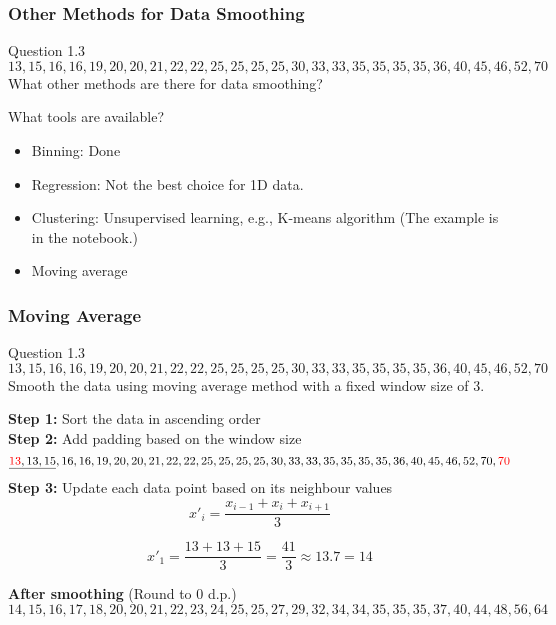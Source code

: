 \documentclass[aspectratio=169, 10pt]{beamer}
\begin{document}
\begin{frame}[t]
    \frametitle{Other Methods for Data Smoothing}

    \begin{block}{Question 1.3}
        \[13,15,16,16,19,20,20,21,22,22,25,25,25,25,30,33,33,35,35,35,35,36,40,45,46,52,70\]
        What other methods are there for data smoothing?
    \end{block}

    What tools are available?
    \begin{itemize}
        \item Binning: Done
        \item Regression: Not the best choice for 1D data.
        \item Clustering: Unsupervised learning, e.g., K-means algorithm (The example is in the notebook.)
        \item Moving average
    \end{itemize}

\end{frame}

\begin{frame}[t]
    \frametitle{Moving Average}
    \small

    \begin{block}{Question 1.3}
        \[13,15,16,16,19,20,20,21,22,22,25,25,25,25,30,33,33,35,35,35,35,36,40,45,46,52,70\]
        Smooth the data using moving average method with a fixed window size of 3.
    \end{block}

    \textbf{Step 1:} Sort the data in ascending order \\
    \textbf{Step 2:} Add padding based on the window size
    \[\underline{\textcolor{red}{13},13,15},16,16,19,20,20,21,22,22,25,25,25,25,30,33,33,35,35,35,35,36,40,45,46,52,70,\textcolor{red}{70}\]
    \textbf{Step 3:} Update each data point based on its neighbour values
    \[x'_i = \frac{x_{i-1} + x_i + x_{i+1}}{3}\]

    \[x'_1 = \frac{13+13+15}{3}=\frac{41}{3}\approx 13.7 = 14 \]

    \textbf{After smoothing} (Round to 0 d.p.)
    \[14, 15, 16, 17, 18, 20, 20, 21, 22, 23, 24, 25, 25, 27, 29, 32, 34, 34, 35, 35, 35, 37, 40, 44, 48, 56, 64\]
\end{frame}
\end{document}
